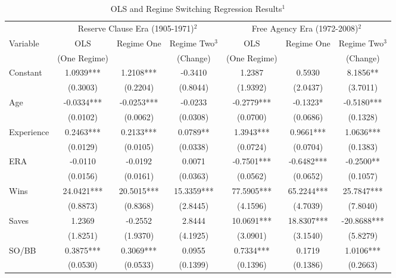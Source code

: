 \documentclass[12pt]{article}
\begin{document}
\setcounter{page}{19}
\begin{sidewaystable}
\begin{center}
\label{tb:pitchers}\caption{OLS and Regime Switching Regression Results$^{1}$}
\vspace*{1pc}
\begin{tabular}{l|c|cc|c|cc} 
\multicolumn{1}{c}{} & \multicolumn{3}{c}{Reserve Clause Era (1905-1971)$^{2}$} & \multicolumn{3}{c}{Free Agency Era (1972-2008)$^{2}$}\\ 
 \multirow{2}{*}{Variable} & OLS & \multirow{2}{*}{Regime One} & Regime Two$^{3}$ & OLS & \multirow{2}{*}{Regime One} & Regime Two$^{3}$ \\ 
 & (One Regime) & & (Change) & (One Regime) &  & (Change) \\ \hline
 \multirow{2}{*}{Constant} & 1.0939*** & 1.2108*** & -0.3410  & 1.2387  & 0.5930  & 8.1856** \\ 
 & (0.3003) & (0.2204) & (0.8044) & (1.9392) & (2.0437) & (3.7011) \\ [0.4pc]
 \multirow{2}{*}{Age} & -0.0334*** & -0.0253*** & -0.0233  & -0.2779*** & -0.1323* & -0.5180*** \\ 
 & (0.0102) & (0.0062) & (0.0308) & (0.0700) & (0.0686) & (0.1328) \\ [0.4pc]
 \multirow{2}{*}{Experience} & 0.2463*** & 0.2133*** & 0.0789** & 1.3943*** & 0.9661*** & 1.0636*** \\ 
 & (0.0129) & (0.0105) & (0.0338) & (0.0724) & (0.0704) & (0.1383) \\ [0.4pc]
 \multirow{2}{*}{ERA} & -0.0110  & -0.0192  & 0.0071  & -0.7501*** & -0.6482*** & -0.2500** \\ 
 & (0.0156) & (0.0161) & (0.0363) & (0.0562) & (0.0652) & (0.1057) \\ [0.4pc]
 \multirow{2}{*}{Wins} & 24.0421*** & 20.5015*** & 15.3359*** & 77.5905*** & 65.2244*** & 25.7847*** \\ 
 & (0.8873) & (0.8368) & (2.8445) & (4.1596) & (4.7039) & (7.8040) \\ [0.4pc]
 \multirow{2}{*}{Saves} & 1.2369  & -0.2552  & 2.8444  & 10.0691*** & 18.8307*** & -20.8688*** \\ 
 & (1.8251) & (1.9370) & (4.1925) & (3.0901) & (3.1540) & (5.8279) \\ [0.4pc]
 \multirow{2}{*}{SO/BB} & 0.3875*** & 0.3069*** & 0.0955  & 0.7334*** & 0.1719  & 1.0106*** \\ 
 & (0.0530) & (0.0533) & (0.1399) & (0.1396) & (0.1386) & (0.2663) \\ [0.4pc]

\end{tabular}
\end{center}
\end{sidewaystable}
\end{document}
